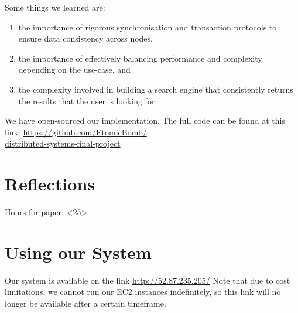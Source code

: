 \documentclass[sigplan, screen, 10pt]{acmart}
\begin{document}
Some things we learned are:
\begin{enumerate}
  \item the importance of rigorous synchronisation and transaction protocols to ensure data consistency across nodes,
  \item the importance of effectively balancing performance and complexity depending on the use-case, and
  \item the complexity involved in building a search engine that consistently returns the results that the user is looking for.
\end{enumerate}

We have open-sourced our implementation. The full code can be found at this link: 
\url{https://github.com/EtomicBomb/} \\
\url{distributed-systems-final-project}


{\small

}

\appendix

\section{Reflections}
\label{reflections}


Hours for paper: <25>

\section{Using our System}
\label{using-apx}

Our system is available on the link \url{http://52.87.235.205/}
Note that due to cost limitations, we cannot run our EC2 instances indefinitely, so this link will no longer be available after a certain timeframe.
\end{document}
